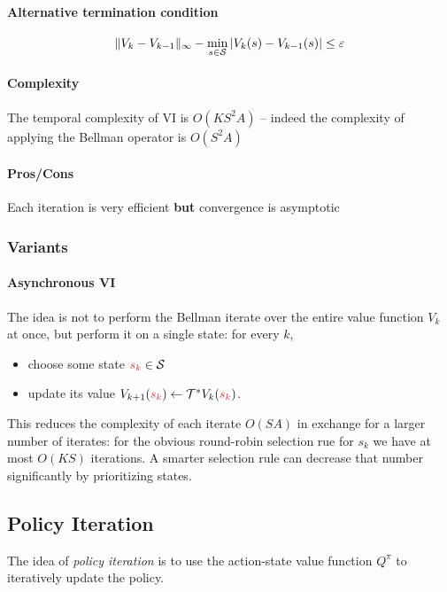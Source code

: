 \documentclass[../course-notes.tex]{subfiles}
\begin{document}
\paragraph{Alternative termination condition}
\[
	\|V_k-V_{k-1}\|_\infty -
	\min_{s\in\mathcal{S}} |V_k(s) - V_{k-1}(s)| \leq \varepsilon
\]

\paragraph{Complexity} The temporal complexity of VI is $O(KS^2A)$ -- indeed the complexity of applying the Bellman operator is $O(S^2A)$

\paragraph{{\bluefont Pros}/{\redfont Cons}} Each iteration is very efficient \textbf{but} convergence is asymptotic


\subsubsection{Variants}

\paragraph{Asynchronous VI} The idea is not to perform the Bellman iterate over the entire value function $V_k$ at once, but perform it on a single state: for every $k$,
\begin{itemize}
	\item choose some state ${\redfont s_k} \in \calS$
	\item update its value $V_{k+1}({\redfont s_k}) \leftarrow \calT^*V_k({\redfont s_k})$.
\end{itemize}
This reduces the complexity of each iterate $O(SA)$ in exchange for a larger number of iterates: for the obvious round-robin selection rue for $s_k$ we have at most $O(KS)$ iterations. A smarter selection rule can decrease that number significantly by prioritizing states.




\subsection{Policy Iteration}

The idea of \textit{policy iteration} is to use the action-state value function $Q^\pi$ to iteratively update the policy.
\end{document}
